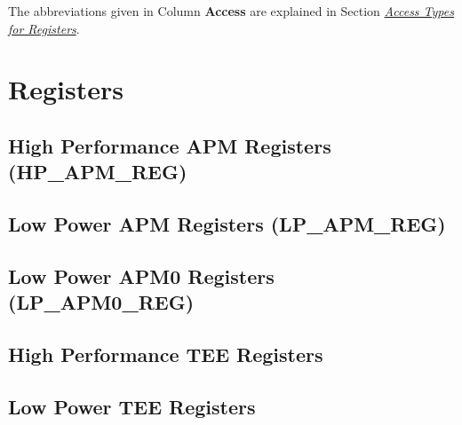 \documentclass[main\_\_EN.tex]{subfiles}
\begin{document}
The abbreviations given in Column \textbf{Access} are explained in Section \hyperref[glossary-access-types]{\textit{Access Types for Registers}}.





\clearpage
\section{Registers}


\subsection{High Performance APM Registers (HP\_APM\_REG)}


\subsection{Low Power APM Registers (LP\_APM\_REG)}


\subsection{Low Power APM0 Registers (LP\_APM0\_REG)}


\subsection{High Performance TEE Registers}


\subsection{Low Power TEE Registers}

\end{document}

